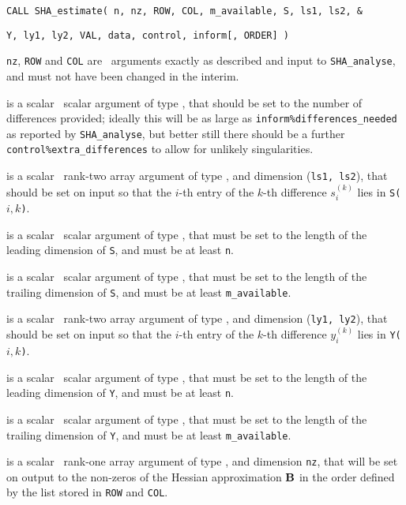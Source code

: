 \documentclass{galahad}
\newcommand{\packagename}{SHA}
\begin{document}
\hspace{8mm}
{\tt CALL \packagename\_estimate( n, nz, ROW, COL, m\_available, S, ls1, ls2, \&}
\vspace*{-1mm}

\hspace{42mm}
{\tt Y, ly1, ly2, VAL, data, control, inform[, ORDER] )}

\vspace*{-2mm}
\begin{description}
 {\tt nz}, {\tt ROW} and {\tt COL} are  \intentin\ arguments 
exactly as described and input to {\tt \packagename\_analyse},
and must not have been changed in the interim.

is a scalar \intentin\ scalar argument of type \integer, that should 
be set to the number of differences provided; ideally this will
be as large as {\tt inform\%differences\_needed} as reported by
{\tt \packagename\_\-analyse}, but better still there should be a 
further {\tt control\%extra\_differences} to allow for unlikely singularities.

 is a scalar \intentin\ rank-two array argument of type 
\realdp, and dimension ({\tt ls1, ls2}), that should be set on input
so that the $i$-th entry of the $k$-th difference $s_i^{(k)}$ lies in
{\tt S(}$i, k${\tt )}.  

is a scalar \intentin\ scalar argument of type \integer, that must be
set to the length of the leading dimension of {\tt S}, and must be at least
{\tt n}. 

is a scalar \intentin\ scalar argument of type \integer, that must be
set to the length of the trailing dimension of {\tt S}, and must be at least
{\tt m\_available}. 

 is a scalar \intentin\ rank-two array argument of type 
\realdp, and dimension ({\tt ly1, ly2}), that should be set on input
so that the $i$-th entry of the $k$-th difference $y_i^{(k)}$ lies in
{\tt Y(}$i, k${\tt )}.  

is a scalar \intentin\ scalar argument of type \integer, that must be
set to the length of the leading dimension of {\tt Y}, and must be at least
{\tt n}. 

is a scalar \intentin\ scalar argument of type \integer, that must be
set to the length of the trailing dimension of {\tt Y}, and must be at least
{\tt m\_available}. 

 is a scalar \intentout\ rank-one array argument of type 
\realdp, and dimension {\tt nz}, that will be set on output
to the non-zeros of the Hessian approximation ${\mathbf{B}}$ in the
order defined by the list stored in {\tt ROW} and {\tt COL}.


\end{description}
\end{document}
